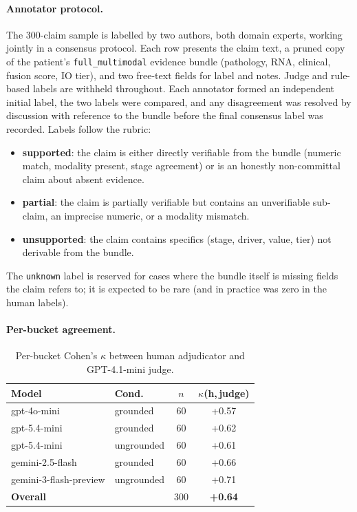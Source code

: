 \documentclass[11pt]{article}
\begin{document}
\paragraph{Annotator protocol.} The 300-claim sample is labelled by two authors, both domain experts, working jointly in a consensus protocol. Each row presents the claim text, a pruned copy of the patient's \texttt{full\_multimodal} evidence bundle (pathology, RNA, clinical, fusion score, IO tier), and two free-text fields for label and notes. Judge and rule-based labels are withheld throughout. Each annotator formed an independent initial label, the two labels were compared, and any disagreement was resolved by discussion with reference to the bundle before the final consensus label was recorded. Labels follow the rubric:
\begin{itemize}
\item \textbf{supported}: the claim is either directly verifiable from the bundle (numeric match, modality present, stage agreement) or is an honestly non-committal claim about absent evidence.
\item \textbf{partial}: the claim is partially verifiable but contains an unverifiable sub-claim, an imprecise numeric, or a modality mismatch.
\item \textbf{unsupported}: the claim contains specifics (stage, driver, value, tier) not derivable from the bundle.
\end{itemize}
The \texttt{unknown} label is reserved for cases where the bundle itself is missing fields the claim refers to; it is expected to be rare (and in practice was zero in the human labels).

\paragraph{Per-bucket agreement.}

\begin{table}[h]
\centering
\small
\begin{tabular}{llcc}
\toprule
\textbf{Model} & \textbf{Cond.} & $n$ & \textbf{$\kappa$(h,\,judge)} \\
\midrule
gpt-4o-mini            & grounded   & 60 & +0.57 \\
gpt-5.4-mini           & grounded   & 60 & +0.62 \\
gpt-5.4-mini           & ungrounded & 60 & +0.61 \\
gemini-2.5-flash       & grounded   & 60 & +0.66 \\
gemini-3-flash-preview & ungrounded & 60 & +0.71 \\
\midrule
\textbf{Overall}       &            & 300 & \textbf{+0.64} \\
\bottomrule
\end{tabular}
\caption{Per-bucket Cohen's $\kappa$ between human adjudicator and GPT-4.1-mini judge.}
\label{tab:perbucket}
\end{table}
\end{document}
